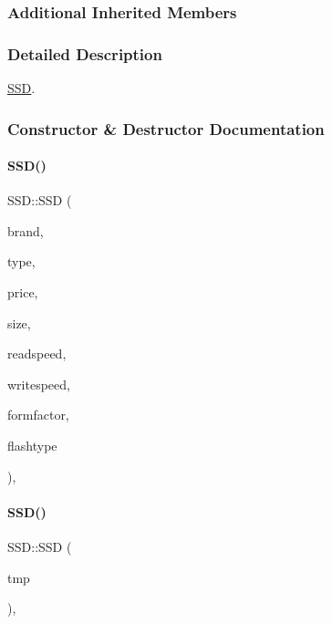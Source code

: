 \subsubsection*{Additional Inherited Members}


\subsubsection{Detailed Description}
\mbox{\hyperlink{class_s_s_d}{S\+SD}}. 

\subsubsection{Constructor \& Destructor Documentation}
\mbox{\label{class_s_s_d_a1e80104276b02f8ca6f016f41a2a5f41}} 
\paragraph{\texorpdfstring{SSD()}{SSD()}\hspace{0.1cm}{\footnotesize\ttfamily [1/2]}}
{\footnotesize\ttfamily S\+S\+D\+::\+S\+SD (\begin{DoxyParamCaption}\item[{\mbox{\hyperlink{class_string}{String}}}]{brand,  }\item[{\mbox{\hyperlink{class_string}{String}}}]{type,  }\item[{int}]{price,  }\item[{int}]{size,  }\item[{int}]{readspeed,  }\item[{int}]{writespeed,  }\item[{\mbox{\hyperlink{class_string}{String}}}]{formfactor,  }\item[{\mbox{\hyperlink{class_string}{String}}}]{flashtype }\end{DoxyParamCaption})\hspace{0.3cm}{\ttfamily [inline]}, {\ttfamily [explicit]}}

\mbox{\label{class_s_s_d_a39a5322942a5320a9a2be8ac7cb4c596}} 
\paragraph{\texorpdfstring{SSD()}{SSD()}\hspace{0.1cm}{\footnotesize\ttfamily [2/2]}}
{\footnotesize\ttfamily S\+S\+D\+::\+S\+SD (\begin{DoxyParamCaption}\item[{\mbox{\hyperlink{struct_temp_input}{Temp\+Input}}}]{tmp }\end{DoxyParamCaption})\hspace{0.3cm}{\ttfamily [inline]}, {\ttfamily [explicit]}}



